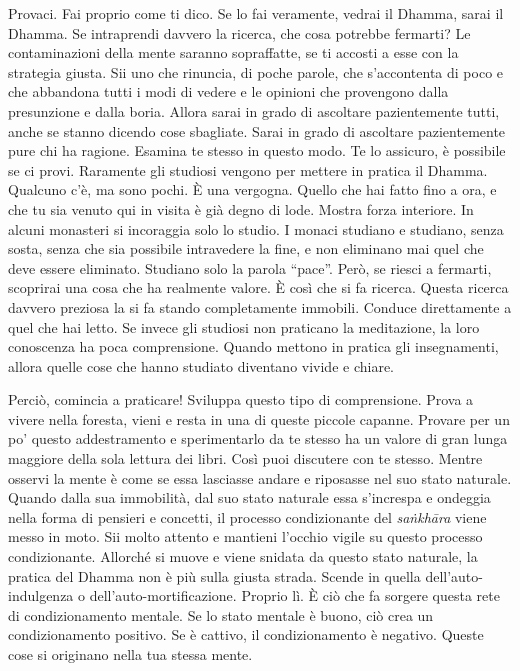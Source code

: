 Provaci. Fai proprio come ti dico. Se lo fai veramente, vedrai il
Dhamma, sarai il Dhamma. Se intraprendi davvero la ricerca, che cosa
potrebbe fermarti? Le contaminazioni della mente saranno sopraffatte, se
ti accosti a esse con la strategia giusta. Sii uno che rinuncia, di
poche parole, che s'accontenta di poco e che abbandona tutti i modi di
vedere e le opinioni che provengono dalla presunzione e dalla boria.
Allora sarai in grado di ascoltare pazientemente tutti, anche se stanno
dicendo cose sbagliate. Sarai in grado di ascoltare pazientemente pure
chi ha ragione. Esamina te stesso in questo modo. Te lo assicuro, è
possibile se ci provi. Raramente gli studiosi vengono per mettere in
pratica il Dhamma. Qualcuno c'è, ma sono pochi. È una vergogna. Quello
che hai fatto fino a ora, e che tu sia venuto qui in visita è già degno
di lode. Mostra forza interiore. In alcuni monasteri si incoraggia solo
lo studio. I monaci studiano e studiano, senza sosta, senza che sia
possibile intravedere la fine, e non eliminano mai quel che deve essere
eliminato. Studiano solo la parola ``pace''. Però, se riesci a fermarti,
scoprirai una cosa che ha realmente valore. È così che si fa ricerca.
Questa ricerca davvero preziosa la si fa stando completamente immobili.
Conduce direttamente a quel che hai letto. Se invece gli studiosi non
praticano la meditazione, la loro conoscenza ha poca comprensione.
Quando mettono in pratica gli insegnamenti, allora quelle cose che hanno
studiato diventano vivide e chiare.

Perciò, comincia a praticare! Sviluppa questo tipo di comprensione.
Prova a vivere nella foresta, vieni e resta in una di queste piccole
capanne. Provare per un po' questo addestramento e sperimentarlo da te
stesso ha un valore di gran lunga maggiore della sola lettura dei libri.
Così puoi discutere con te stesso. Mentre osservi la mente è come se
essa lasciasse andare e riposasse nel suo stato naturale. Quando dalla
sua immobilità, dal suo stato naturale essa s'increspa e ondeggia nella
forma di pensieri e concetti, il processo condizionante del
\emph{saṅkhāra} viene messo in moto. Sii molto attento e mantieni
l'occhio vigile su questo processo condizionante. Allorché si muove e
viene snidata da questo stato naturale, la pratica del Dhamma non è più
sulla giusta strada. Scende in quella dell'auto-indulgenza o
dell'auto-mortificazione. Proprio lì. È ciò che fa sorgere questa rete
di condizionamento mentale. Se lo stato mentale è buono, ciò crea un
condizionamento positivo. Se è cattivo, il condizionamento è negativo.
Queste cose si originano nella tua stessa mente.

